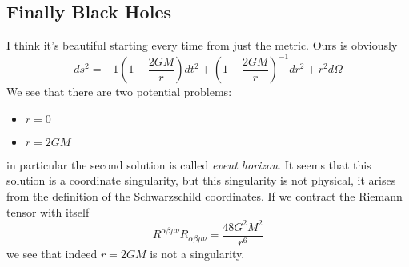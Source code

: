 \subsection{Finally Black Holes}

I think it's beautiful starting every time from just the metric. Ours is obviously
\[
ds^{2} = - 1 \left( 1- \frac{2GM}{r} \right)dt^{2} + \left( 1- \frac{2GM}{r} \right)^{-1} dr^{2} + r^{2}d\Omega 
\]
We see that there are two potential problems:
\begin{itemize}
\item $r = 0$
\item $r = 2GM$
\end{itemize}
in particular the second solution is called \emph{event horizon}. It seems that this solution is a coordinate singularity, but this singularity is not physical, it arises from the definition of the Schwarzschild coordinates.
If we contract the Riemann tensor with itself
\[
R^{\alpha \beta \mu \nu }R_{\alpha \beta \mu \nu } = \frac{48G^{2}M^{2}}{r^{6}}
\]
we see that indeed $r= 2GM$ is not a singularity.\par

